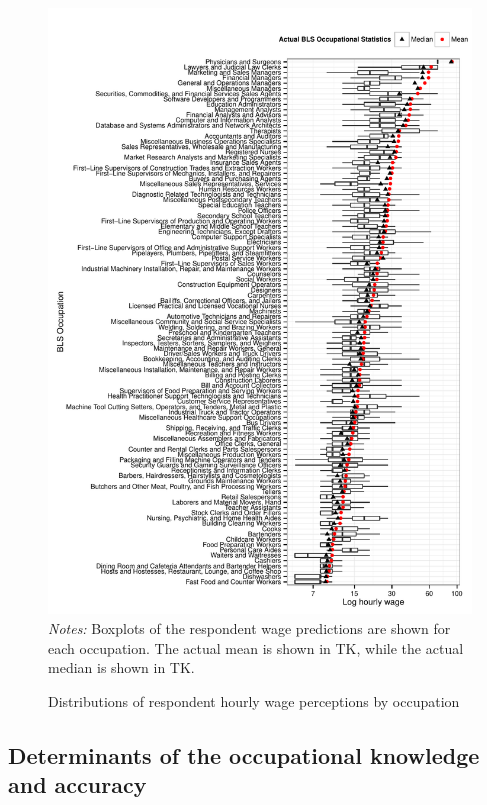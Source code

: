 \documentclass[11pt]{article}
\begin{document}
\begin{figure}
\caption{Distributions of respondent hourly wage perceptions by occupation \label{fig:by_occupation_boxplots}} 
\centering 
\begin{minipage}{0.90\linewidth}
\includegraphics[width = \linewidth]{./plots/box_plots_by_occupation.pdf} 
\emph{Notes:} Boxplots of the respondent wage predictions are shown for each occupation.
The actual mean is shown in TK, while the actual median is shown in TK.  
\end{minipage}
\end{figure} 

\subsection{Determinants of the occupational knowledge and accuracy} 
\end{document}
